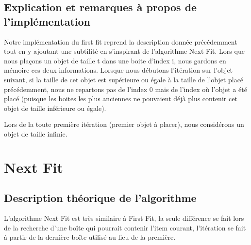 \documentclass{article}
\begin{document}
    \subsection{Explication et remarques à propos de l'implémentation}
    Notre implémentation du first fit reprend la description donnée précédemment
    tout en y ajoutant une subtilité en s'inspirant de l'algorithme Next Fit. Lors que nous plaçons un objet de taille t dans une boite
    d'index i, nous gardons en mémoire ces deux informations. Lorsque nous débutons l'itération
    sur l'objet suivant, si la taille de cet objet est supérieure ou égale à la taille de l'objet placé précédemment, nous ne repartons pas
    de l'index 0 mais de l'index où l'objet a été placé (puisque les boites les plus anciennes ne pouvaient déjà plus contenir cet objet
    de taille inférieure ou égale).

    Lors de la toute première itération (premier objet à placer), nous considérons un objet de taille infinie.



    \section{Next Fit}

    \subsection{Description théorique de l'algorithme}
    L'algorithme Next Fit est très similaire à First Fit, la seule différence se fait lors de la recherche d'une boîte qui pourrait contenir l'item courant, l'itération se fait à partir de la dernière boîte utilisé au lieu de la première.
\end{document}
